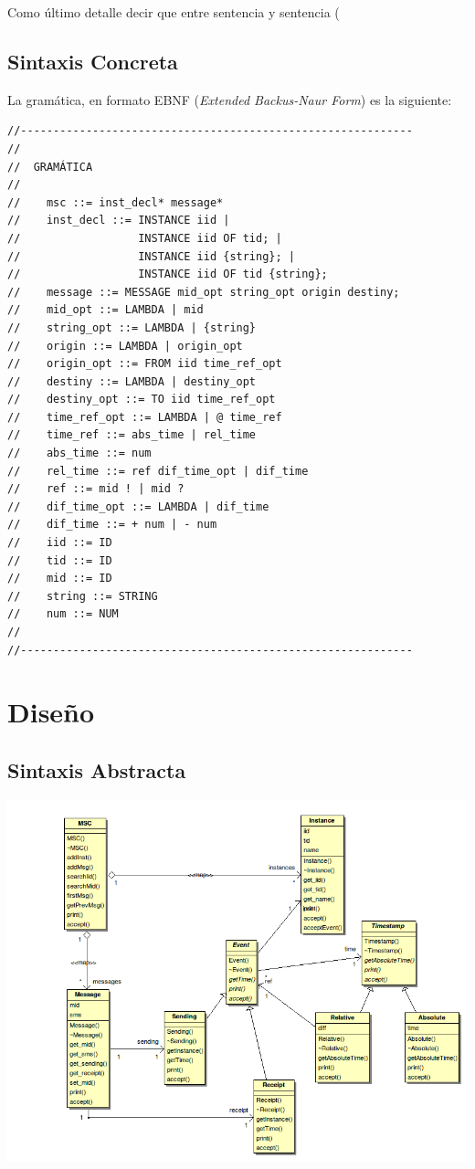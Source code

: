 \documentclass[12pt,a4paper]{report}
\newcommand{\lstsetocl}{
  \lstset{
    language=OCL,
    style=spec,
  }
}
\begin{document}
Como último detalle decir que entre sentencia y sentencia (

\section{Sintaxis Concreta}

La gramática, en formato EBNF (\emph{Extended Backus-Naur Form}) es la siguiente:
\begin{verbatim}
//------------------------------------------------------------
//
//  GRAMÁTICA
//    
//    msc ::= inst_decl* message*
//    inst_decl ::= INSTANCE iid |
//                  INSTANCE iid OF tid; |
//                  INSTANCE iid {string}; |
//                  INSTANCE iid OF tid {string};               
//    message ::= MESSAGE mid_opt string_opt origin destiny;
//    mid_opt ::= LAMBDA | mid
//    string_opt ::= LAMBDA | {string}
//    origin ::= LAMBDA | origin_opt
//    origin_opt ::= FROM iid time_ref_opt
//    destiny ::= LAMBDA | destiny_opt
//    destiny_opt ::= TO iid time_ref_opt
//    time_ref_opt ::= LAMBDA | @ time_ref
//    time_ref ::= abs_time | rel_time
//    abs_time ::= num
//    rel_time ::= ref dif_time_opt | dif_time
//    ref ::= mid ! | mid ?
//    dif_time_opt ::= LAMBDA | dif_time
//    dif_time ::= + num | - num
//    iid ::= ID
//    tid ::= ID
//    mid ::= ID
//    string ::= STRING
//    num ::= NUM
//
//------------------------------------------------------------
\end{verbatim}

\chapter{Diseño}
\label{ch:diseno}

\section{Sintaxis Abstracta}
\lstsetocl

\includegraphics[scale=0.5]{./images/fig2}
\end{document}
